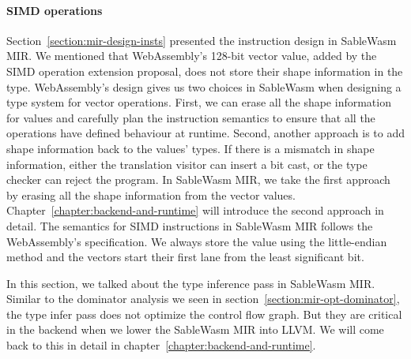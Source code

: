 \paragraph{SIMD operations}
Section~\ref{section:mir-design-insts} presented the instruction design in
SableWasm MIR. We mentioned
that WebAssembly's 128-bit vector value, added by the SIMD operation extension
proposal, does not store their shape information in the type. WebAssembly's
design gives us two choices in SableWasm when designing a type system for vector
operations. First, we can erase all the shape information for values and
carefully plan the instruction semantics to ensure that all the operations
have defined behaviour at runtime. Second, another approach is to add shape
information back to the values' types. If there is a mismatch in shape
information, either the translation visitor can insert a bit cast, or the type
checker can reject the program. In SableWasm MIR, we take the first approach by
erasing all the shape information from the vector values.
Chapter~\ref{chapter:backend-and-runtime} will introduce the second approach in
detail. The semantics for SIMD instructions in SableWasm MIR follows the
WebAssembly's specification. We always store the value using the little-endian
method and the vectors start their first lane from the least significant bit.

In this section, we talked about the type inference pass in SableWasm MIR.
Similar to the dominator analysis we seen in
section~\ref{section:mir-opt-dominator}, the type infer pass
does not optimize the control flow graph. But they are critical in the backend
when we lower the SableWasm MIR into LLVM. We will come back to this in detail
in chapter~\ref{chapter:backend-and-runtime}.